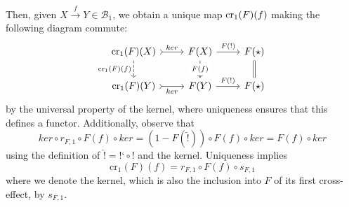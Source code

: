 Then, given $X\xrightarrow{f}Y \in \mathcal{B}_1$, we obtain a unique map $\text{cr}_1(F)(f)$ making the following diagram commute:
\[\begin{tikzcd}
	{\text{cr}_1(F)(X)} & {F(X)} & {F(\star)} \\
	{\text{cr}_1(F)(Y)} & {F(Y)} & {F(\star)}
	\arrow["{F(!)}", from=1-2, to=1-3]
	\arrow["ker", tail, from=1-1, to=1-2]
	\arrow["{F(!)}", from=2-2, to=2-3]
	\arrow["ker"', tail, from=2-1, to=2-2]
	\arrow[Rightarrow, no head, from=1-3, to=2-3]
	\arrow["{F(f)}"{description}, from=1-2, to=2-2]
	\arrow["{\text{cr}_1(F)(f)}"', dashed, from=1-1, to=2-1]
\end{tikzcd}\]
by the universal property of the kernel, where uniqueness ensures that this defines a functor. Additionally, observe that
\begin{equation*}
    ker\circ r_{F,1}\circ F(f)\circ ker =(1-F(\hat{!}))\circ F(f)\circ ker = F(f)\circ ker 
\end{equation*}
using the definition of $\hat{!} = \text{!`}\circ !$ and the kernel. Uniqueness implies 
\begin{equation}\label{eq:projFormula1}
    \text{cr}_1(F)(f) = r_{F,1}\circ F(f)\circ s_{F,1}
\end{equation}
where we denote the kernel, which is also the inclusion into $F$ of its first cross-effect, by $s_{F,1}$.



